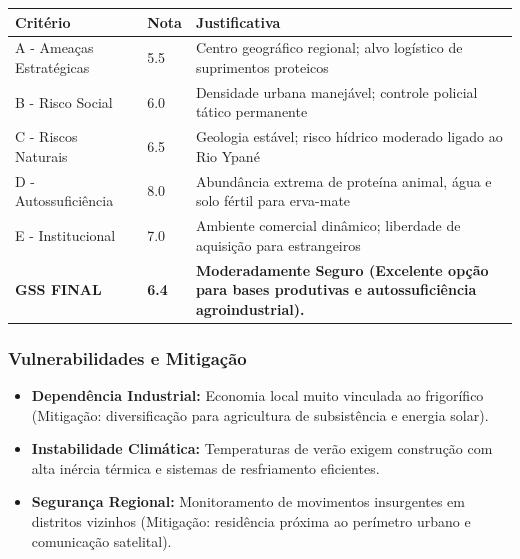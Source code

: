 \begin{table}[ht!]
\small \begin{tabular}{p{3.0cm}p{0.8cm}p{6.0cm}} \toprule
\textbf{Critério} & \textbf{Nota} & \textbf{Justificativa} \\ \midrule
A - Ameaças Estratégicas & 5.5 & Centro geográfico regional; alvo logístico de suprimentos proteicos \\
B - Risco Social & 6.0 & Densidade urbana manejável; controle policial tático permanente \\
C - Riscos Naturais & 6.5 & Geologia estável; risco hídrico moderado ligado ao Rio Ypané \\
D - Autossuficiência & 8.0 & Abundância extrema de proteína animal, água e solo fértil para erva-mate \\
E - Institucional & 7.0 & Ambiente comercial dinâmico; liberdade de aquisição para estrangeiros \\
\midrule \textbf{GSS FINAL} & \textbf{6.4} & \textbf{Moderadamente Seguro (Excelente opção para bases produtivas e autossuficiência agroindustrial).} \\ \bottomrule \end{tabular}
\end{table}
\subsubsection{Vulnerabilidades e
Mitigação}

\begin{itemize}
\tightlist
\item
  \textbf{Dependência Industrial:} Economia local muito vinculada ao
  frigorífico (Mitigação: diversificação para agricultura de
  subsistência e energia solar).
\item
  \textbf{Instabilidade Climática:} Temperaturas de verão exigem
  construção com alta inércia térmica e sistemas de resfriamento
  eficientes.
\item
  \textbf{Segurança Regional:} Monitoramento de movimentos insurgentes
  em distritos vizinhos (Mitigação: residência próxima ao perímetro
  urbano e comunicação satelital).
\end{itemize}

